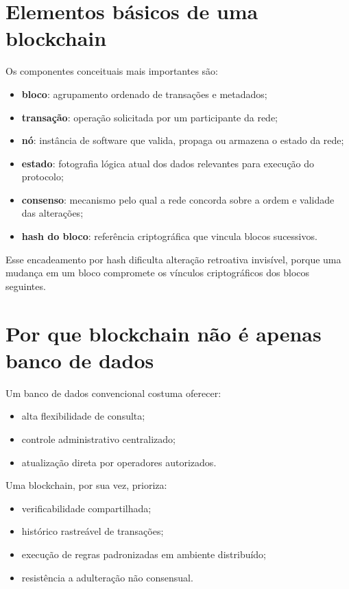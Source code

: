 \section{Elementos básicos de uma blockchain}
Os componentes conceituais mais importantes são:
\begin{itemize}[leftmargin=*]
  \item \textbf{bloco}: agrupamento ordenado de transações e metadados;
  \item \textbf{transação}: operação solicitada por um participante da rede;
  \item \textbf{nó}: instância de software que valida, propaga ou armazena o estado da rede;
  \item \textbf{estado}: fotografia lógica atual dos dados relevantes para execução do protocolo;
  \item \textbf{consenso}: mecanismo pelo qual a rede concorda sobre a ordem e validade das alterações;
  \item \textbf{hash do bloco}: referência criptográfica que vincula blocos sucessivos.
\end{itemize}

Esse encadeamento por hash dificulta alteração retroativa invisível, porque uma mudança em um bloco compromete os vínculos criptográficos dos blocos seguintes.

\section{Por que blockchain não é apenas banco de dados}
Um banco de dados convencional costuma oferecer:
\begin{itemize}[leftmargin=*]
  \item alta flexibilidade de consulta;
  \item controle administrativo centralizado;
  \item atualização direta por operadores autorizados.
\end{itemize}

Uma blockchain, por sua vez, prioriza:
\begin{itemize}[leftmargin=*]
  \item verificabilidade compartilhada;
  \item histórico rastreável de transações;
  \item execução de regras padronizadas em ambiente distribuído;
  \item resistência a adulteração não consensual.
\end{itemize}

